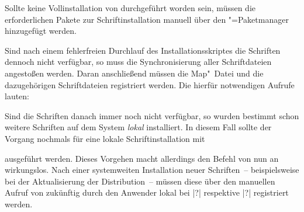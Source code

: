 Sollte keine Vollinstallation von  durchgeführt 
worden sein, müssen die erforderlichen Pakete zur Schriftinstallation manuell 
über den "=Paketmanager hinzugefügt werden.

Sind nach einem fehlerfreien Durchlauf des Installationsskriptes die Schriften 
dennoch nicht verfügbar, so muss die Synchronisierung aller Schriftdateien 
angestoßen werden. Daran anschließend müssen die Map"~Datei und die 
dazugehörigen Schriftdateien registriert werden. Die hierfür notwendigen 
Aufrufe lauten:
%
\begin{quoting}
\newline
{}\newline
{}
\end{quoting}
%
Sind die Schriften danach immer noch nicht verfügbar, so wurden bestimmt schon 
weitere Schriften auf dem System \emph{lokal} installiert. In diesem Fall 
sollte der Vorgang nochmals für eine lokale Schriftinstallation mit 
%
\begin{quoting}
\newline
{}\newline
{}
\end{quoting}
%
ausgeführt werden. Dieses Vorgehen macht allerdings den Befehl 
 von nun an wirkungslos. Nach einer systemweiten Installation 
neuer Schriften~-- beispielsweise bei der Aktualisierung der Distribution~-- 
müssen diese über den manuellen Aufruf von  zukünftig durch den 
Anwender lokal bei |?| respektive 
|?| registriert werden.



